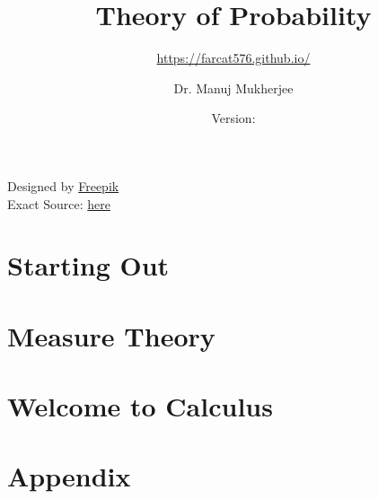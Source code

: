 \documentclass[11pt,twoside=semi,openright,numbers=noenddot,titlepage=false]{scrbook}
\title{Theory of Probability}
\subtitle{\url{https://farcat576.github.io/}}
\author{Dr. Manuj Mukherjee}
\date{Version: \napkinversion}
\begin{document}
\frontmatter
\maketitle

\bgroup
\fboxrule=4pt
\noindent{}
\begin{center}
	Designed by \href{www.freepik.com}{Freepik} \\
	Exact Source: \href{https://www.freepik.com/free-photo/closeup-abstract-watercolor-background_2768350.htm#fromView=image_search&page=1&position=24&uuid=895fbb9c-0a69-4bd5-ac86-3b253fd9093b}{here}
\end{center}
\egroup
\newpage




\setcounter{chapter}{-1} %


\cleardoublepage
{}
\setcounter{temppage}{\value{page}}
\mainmatter
\setcounter{page}{\value{temppage}}

\tableofcontents


\part{Starting Out}
\label{part:startout}
\parttoc
\setcounter{chapter}{-1} %


\part{Measure Theory}
\label{part:measure}
\parttoc

\part{Welcome to Calculus}
\label{part:calc}
\parttoc

\part{Appendix}
\parttoc
\appendix







\backmatter

\clearpage
\printbibliography[type=image,title={Image Attributions}]
\printbibliography[nottype=image]
\end{document}
